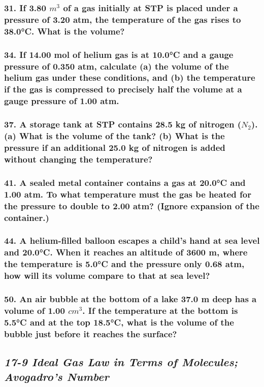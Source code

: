 \documentclass{article}
\begin{document}
\subsubsection*{
    31. If 3.80 $m^3$ of a gas initially at STP is placed under a pressure of 3.20 atm,
    the temperature of the gas rises to 38.0°C. What is the volume?
}
\subsubsection*{
    34. If 14.00 mol of helium gas is at 10.0°C and a gauge pressure of 0.350 atm,
    calculate (a) the volume of the helium gas under these conditions, and (b) the
    temperature if the gas is compressed to precisely half the volume at a gauge
    pressure of 1.00 atm.
}
\subsubsection*{
    37. A storage tank at STP contains 28.5 kg of nitrogen ($N_2$). (a) What is
    the volume of the tank? (b) What is the pressure if an additional 25.0 kg
    of nitrogen is added without changing the temperature?
}
\subsubsection*{
    41. A sealed metal container contains a gas at 20.0°C and 1.00 atm. To what
    temperature must the gas be heated for the pressure to double to 2.00 atm? 
    (Ignore expansion of the container.)
}
\subsubsection*{
    44. A helium-filled balloon escapes a child’s hand at sea level and 20.0°C.
    When it reaches an altitude of 3600 m, where the temperature is 5.0°C and
    the pressure only 0.68 atm, how will its volume compare to that at sea level?
}
\subsubsection*{
    50. An air bubble at the bottom of a lake 37.0 m deep has a volume of
    1.00 $cm^3$. If the temperature at the bottom is 5.5°C and at the top
    18.5°C, what is the volume of the bubble just before it reaches the surface?
}
\begin{center}
    \subsection*{\textbf{\textit{17-9 Ideal Gas Law in Terms of Molecules;
    Avogadro's Number}}}
\end{center}
\end{document}
